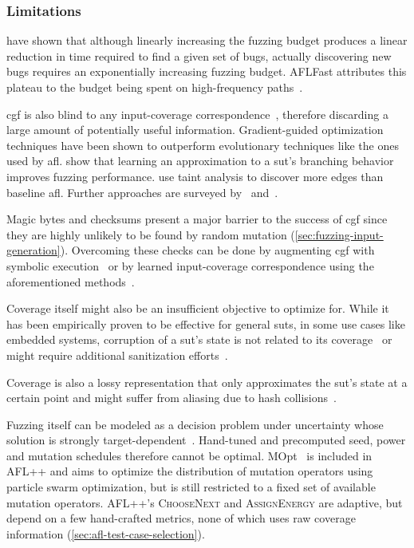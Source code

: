 \subsubsection{Limitations}

\textcite{bohme_fuzzing_2020} have shown that although linearly increasing the fuzzing budget
produces a linear reduction in time required to find a given set of bugs, actually
discovering new bugs requires an exponentially increasing fuzzing budget.
AFLFast attributes this plateau to the budget being spent on high-frequency
paths~\cite{bohme_coverage-based_2016}.

\gls{cgf} is also blind to any input-coverage correspondence~\cite{manes_art_2019}, therefore
discarding a large amount of potentially useful information.
Gradient-guided optimization techniques have been shown to outperform evolutionary
techniques like the ones used by \gls{afl}.
\textcite{she_neuzz_2019,she_mtfuzz_2020} show that learning an approximation to a \gls{sut}'s branching
behavior improves fuzzing performance.
\textcite{gan_greyone_nodate} use taint analysis to discover more edges than baseline \gls{afl}.
Further approaches are surveyed by~\textcite{wang_systematic_2020} and~\textcite{qiu_survey_2025}.

Magic bytes and checksums present a major barrier to the success of \gls{cgf} since
they are highly unlikely to be found by random mutation (\cref{sec:fuzzing-input-generation}).
Overcoming these checks can be done by augmenting \gls{cgf} with symbolic
execution~\cite{stephens_driller_2016} or by learned input-coverage
correspondence using the aforementioned methods~\cite{aschermann_redqueen_2019}.

Coverage itself might also be an insufficient objective to optimize for. While
it has been empirically proven to be effective for general \glspl{sut}, in some use
cases like embedded systems, corruption of a \gls{sut}'s state is not related to its
coverage~\cite{muench_what_2018} or might require additional sanitization
efforts~\cite{zhang_debloating_nodate}.

Coverage is also a lossy representation that only approximates the \gls{sut}'s state
at a certain point and might suffer from aliasing due to hash collisions~\cite{gan_collafl_2018}.

Fuzzing itself can be modeled as a decision problem under uncertainty whose
solution is strongly target-dependent~\cite{woo_scheduling_2013,bohme_coverage-based_2016}.
Hand-tuned and precomputed seed, power and mutation schedules therefore cannot be optimal.
MOpt~\cite{lyu_mopt_nodate} is included in AFL++ and aims to optimize the distribution of
mutation operators using particle swarm optimization, but is still restricted to
a fixed set of available mutation operators.
AFL++'s \textsc{ChooseNext} and \textsc{AssignEnergy} are adaptive, but depend on a few hand-crafted metrics,
none of which uses raw coverage information (\cref{sec:afl-test-case-selection}).

